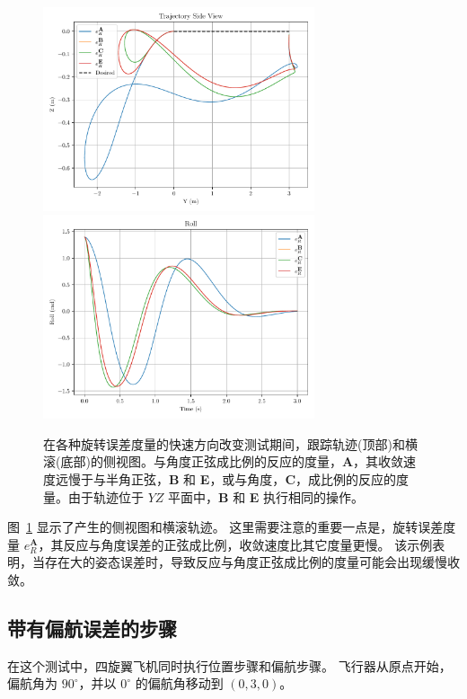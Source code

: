 \begin{figure}
  \begin{center}
  \includegraphics[width=8cm]{media/quickchange/sideview.pdf}
  \includegraphics[width=8cm]{media/quickchange/Roll.pdf}
  \caption{在各种旋转误差度量的快速方向改变测试期间，跟踪轨迹(顶部)和横滚(底部)的侧视图。与角度正弦成比例的反应的度量，\textbf{A}，其收敛速度远慢于与半角正弦，\textbf{B} 和 \textbf{E}，或与角度，\textbf{C}，成比例的反应的度量。由于轨迹位于 $YZ$ 平面中，\textbf{B} 和 \textbf{E} 执行相同的操作。}
  \label{fig:qc_side}
  \end{center}
\end{figure}

图~\ref{fig:qc_side} 显示了产生的侧视图和横滚轨迹。
这里需要注意的重要一点是，旋转误差度量 $e_R^{\textbf{A}}$，其反应与角度误差的正弦成比例，收敛速度比其它度量更慢。
该示例表明，当存在大的姿态误差时，导致反应与角度正弦成比例的度量可能会出现缓慢收敛。

\subsection{带有偏航误差的步骤}

在这个测试中，四旋翼飞机同时执行位置步骤和偏航步骤。
飞行器从原点开始，偏航角为 $90^\circ$，并以 $0^\circ$ 的偏航角移动到 $(0, 3, 0)$。

